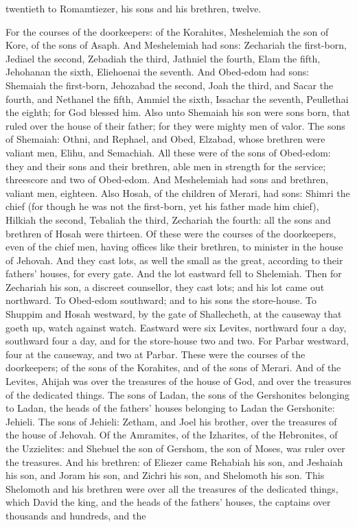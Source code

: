 twentieth to Romamtiezer, his sons and his brethren, twelve. 

For the courses of the doorkeepers: of the Korahites, Meshelemiah the son of Kore, of the sons of Asaph. And Meshelemiah had sons: Zechariah the first-born, Jediael the second, Zebadiah the third, Jathniel the fourth, Elam the fifth, Jehohanan the sixth, Eliehoenai the seventh. And Obed-edom had sons: Shemaiah the first-born, Jehozabad the second, Joah the third, and Sacar the fourth, and Nethanel the fifth, Ammiel the sixth, Issachar the seventh, Peullethai the eighth; for God blessed him. Also unto Shemaiah his son were sons born, that ruled over the house of their father; for they were mighty men of valor. The sons of Shemaiah: Othni, and Rephael, and Obed, Elzabad, whose brethren were valiant men, Elihu, and Semachiah. All these were of the sons of Obed-edom: they and their sons and their brethren, able men in strength for the service; threescore and two of Obed-edom. And Meshelemiah had sons and brethren, valiant men, eighteen. Also Hosah, of the children of Merari, had sons: Shimri the chief (for though he was not the first-born, yet his father made him chief), Hilkiah the second, Tebaliah the third, Zechariah the fourth: all the sons and brethren of Hosah were thirteen.  Of these were the courses of the doorkeepers, even of the chief men, having offices like their brethren, to minister in the house of Jehovah. And they cast lots, as well the small as the great, according to their fathers’ houses, for every gate. And the lot eastward fell to Shelemiah. Then for Zechariah his son, a discreet counsellor, they cast lots; and his lot came out northward. To Obed-edom southward; and to his sons the store-house. To Shuppim and Hosah westward, by the gate of Shallecheth, at the causeway that goeth up, watch against watch. Eastward were six Levites, northward four a day, southward four a day, and for the store-house two and two. For Parbar westward, four at the causeway, and two at Parbar. These were the courses of the doorkeepers; of the sons of the Korahites, and of the sons of Merari.  And of the Levites, Ahijah was over the treasures of the house of God, and over the treasures of the dedicated things. The sons of Ladan, the sons of the Gershonites belonging to Ladan, the heads of the fathers’ houses belonging to Ladan the Gershonite: Jehieli. The sons of Jehieli: Zetham, and Joel his brother, over the treasures of the house of Jehovah. Of the Amramites, of the Izharites, of the Hebronites, of the Uzzielites: and Shebuel the son of Gershom, the son of Moses, was ruler over the treasures. And his brethren: of Eliezer came Rehabiah his son, and Jeshaiah his son, and Joram his son, and Zichri his son, and Shelomoth his son. This Shelomoth and his brethren were over all the treasures of the dedicated things, which David the king, and the heads of the fathers’ houses, the captains over thousands and hundreds, and the 